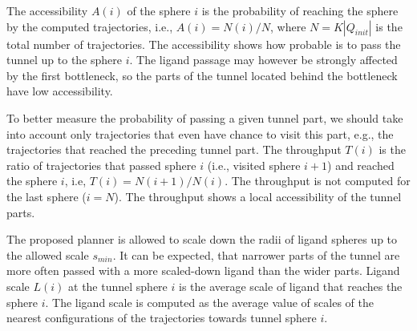 \documentclass{svmult}
\def\R{\mathbb{R}}
\def\QI{Q_{init}}
\def\smin{s_{min}}
\begin{document}
The accessibility $A(i)$ of the sphere $i$ is the probability of reaching the sphere by the computed trajectories,
i.e., $A(i)=N(i) / N$, where $N=K|\QI|$ is the total number of trajectories.
The accessibility  shows how probable is to pass the tunnel up to the sphere $i$.
The  ligand passage may however be strongly affected by the first bottleneck, so the parts of the tunnel located behind
the bottleneck have low accessibility.

To better measure the probability of passing a given tunnel part, we should take into account only trajectories that even have chance
to visit this part, e.g., the trajectories that reached the preceding tunnel part.
The throughput $T(i)$ is the ratio of trajectories that passed sphere $i$ (i.e., visited sphere $i+1$) and reached the sphere $i$,
i.e, $T(i) = N(i+1) / N(i)$. 
The throughput is not computed for the last sphere ($i=N$).
The throughput shows a local accessibility of the tunnel parts.


The proposed planner is allowed to scale down the radii of ligand spheres up to the allowed scale $\smin$. 
It can be expected, that narrower parts of the tunnel are more often passed with a more scaled-down ligand than
the wider parts.
Ligand scale $L(i)$ at the tunnel sphere $i$ is the average scale of ligand that reaches the sphere $i$.
The ligand scale is computed as the average value of scales of the nearest configurations of the trajectories towards tunnel sphere
$i$.

\end{document}
